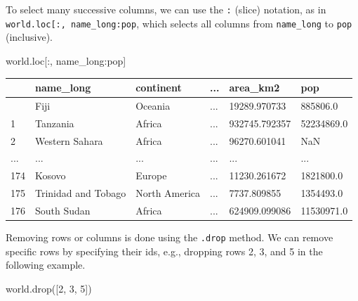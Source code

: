 \documentclass[
  letterpaper,
]{krantz}
\newenvironment{Shaded}{\begin{snugshade}}{\end{snugshade}}
\newcommand{\DecValTok}[1]{\textcolor[rgb]{0.68,0.00,0.00}{#1}}
\newcommand{\NormalTok}[1]{\textcolor[rgb]{0.00,0.23,0.31}{#1}}
\newcommand{\StringTok}[1]{\textcolor[rgb]{0.13,0.47,0.30}{#1}}
\begin{document}
To select many successive columns, we can use the \texttt{:} (slice)
notation, as in
\texttt{world.loc{[}:,\ \textquotesingle{}name\_long\textquotesingle{}:\textquotesingle{}pop\textquotesingle{}{]}},
which selects all columns from \texttt{name\_long} to \texttt{pop}
(inclusive).

\begin{Shaded}
\begin{Highlighting}[]
\NormalTok{world.loc[:, }\StringTok{\textquotesingle{}name\_long\textquotesingle{}}\NormalTok{:}\StringTok{\textquotesingle{}pop\textquotesingle{}}\NormalTok{]}
\end{Highlighting}
\end{Shaded}

\begin{longtable}[]{@{}llllll@{}}
\toprule\noalign{}
& name\_long & continent & ... & area\_km2 & pop \\
\midrule\noalign{}
\endhead
\bottomrule\noalign{}
\endlastfoot
0 & Fiji & Oceania & ... & 19289.970733 & 885806.0 \\
1 & Tanzania & Africa & ... & 932745.792357 & 52234869.0 \\
2 & Western Sahara & Africa & ... & 96270.601041 & NaN \\
... & ... & ... & ... & ... & ... \\
174 & Kosovo & Europe & ... & 11230.261672 & 1821800.0 \\
175 & Trinidad and Tobago & North America & ... & 7737.809855 &
1354493.0 \\
176 & South Sudan & Africa & ... & 624909.099086 & 11530971.0 \\
\end{longtable}

Removing rows or columns is done using the \texttt{.drop} method. We can
remove specific rows by specifying their ids, e.g., dropping rows 2, 3,
and 5 in the following example.

\begin{Shaded}
\begin{Highlighting}[]
\NormalTok{world.drop([}\DecValTok{2}\NormalTok{, }\DecValTok{3}\NormalTok{, }\DecValTok{5}\NormalTok{])}
\end{Highlighting}
\end{Shaded}
\end{document}
